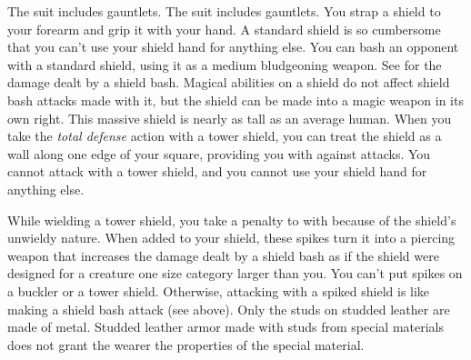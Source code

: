          The suit includes gauntlets.
         The suit includes gauntlets.
         You strap a shield to your forearm and grip it with your hand. A standard shield is so cumbersome that you can't use your shield hand for anything else.
         You can bash an opponent with a standard shield, using it as a medium bludgeoning weapon. See  for the damage dealt by a shield bash.
        Magical abilities on a shield do not affect shield bash attacks made with it, but the shield can be made into a magic weapon in its own right.
         This massive shield is nearly as tall as an average human.
        When you take the \textit{total defense} action with a tower shield, you can treat the shield as a wall along one edge of your square, providing you with  against attacks.
        You cannot attack with a tower shield, and you cannot use your shield hand for anything else.

        While wielding a tower shield, you take a  penalty to  with  because of the shield's unwieldy nature.
         When added to your shield, these spikes turn it into a piercing weapon that increases the damage dealt by a shield bash as if the shield were designed for a creature one size category larger than you. You can't put spikes on a buckler or a tower shield. Otherwise, attacking with a spiked shield is like making a shield bash attack (see above).
         Only the studs on studded leather are made of metal.
        Studded leather armor made with studs from special materials does not grant the wearer the properties of the special material.

